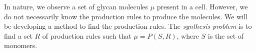 In nature, we observe a set of glycan molecules $\mu$ present in a cell.
%
However, we do not necessarily know the production rules to produce the molecules.
%
We will be developing a method to find the production rules.
%
The {\em synthesis problem} is to find a set $R$ of production rules
such that $\mu = P(S,R)$,
where $S$ is the set of monomers.




